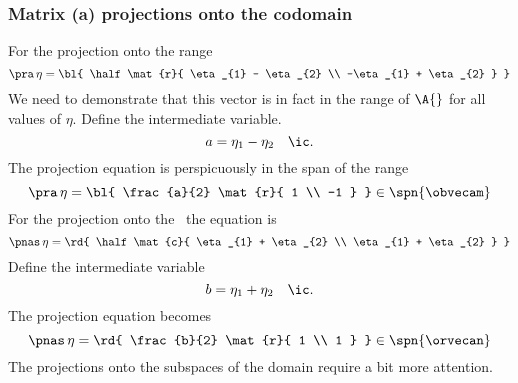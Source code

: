 \subsubsection{Matrix (a) projections onto the codomain}
For the projection onto the range
\begin{equation}
  \pra \,  \eta = {\bl{ \half
   \mat{r}{  \eta_{1} - \eta_{2} \\ 
            -\eta_{1} + \eta_{2} } }}
\end{equation}
We need to demonstrate that this vector is in fact in the range of $\A{}$ for all values of $\eta$. Define the intermediate variable.
\begin{equation}
  a = \eta_{1} - \eta_{2} \quad \ic.
\end{equation}
The projection equation is perspicuously in the span of the range
\begin{equation}
  \pra \,  \eta = {\bl{ \frac{a}{2}
   \mat{r}{  1 \\ -1 } }} \in \spn{ \obvecam }
\end{equation}
For the projection onto the \ns \ the equation is
\begin{equation}
  \pnas \,  \eta = {\rd{ \half
  \mat{c}{  \eta_{1} + \eta_{2} \\ 
            \eta_{1} + \eta_{2} } }}
\end{equation}
Define the intermediate variable
\begin{equation}
  b = \eta_{1} + \eta_{2} \quad \ic.
\end{equation}
The projection equation becomes
\begin{equation}
  \pnas \,  \eta = {\rd{ \frac{b}{2}
  \mat{r}{  1 \\ 1 } }} \in \spn{ \orvecan }
\end{equation}
The projections onto the subspaces of the domain require a bit more attention.

